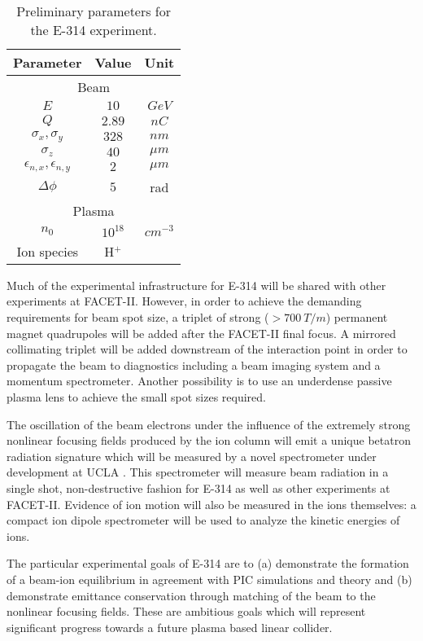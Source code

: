 \documentclass{aac}
\begin{document}
\begin{table}[h]
\begin{tabular}{|c|c|c|}
\hline
Parameter & Value & Unit \\
\hline
\multicolumn{3}{|c|}{Beam} \\
\hline
$E$ & $10$ & $\si{GeV}$  \\
$Q$ & $2.89$  & $\si{nC}$ \\
$\sigma_x,\sigma_y$ & $328$ & $\si{nm}$ \\
$\sigma_z$ & $40$ & $\si{\mu m}$ \\
$\epsilon_{n,x},\epsilon_{n,y}$ & $2$ & $\si{\mu m }$ \\
$\Delta \phi$ & $5$ & rad \\
\hline
\multicolumn{3}{|c|}{Plasma} \\
\hline
$n_0$ & $10^{18}$ & $\si{cm^{-3}}$ \\
Ion species & H$^{+}$ & \\
\hline
\end{tabular}
\caption{Preliminary parameters for the E-314 experiment.}
\label{tab:parameters}
\end{table}

Much of the experimental infrastructure for E-314 will be shared with other experiments at FACET-II. However, in order to achieve the demanding requirements for beam spot size, a triplet of strong ($>\SI{700}{T/m}$) permanent magnet quadrupoles \cite{magnet} will be added after the FACET-II final focus. A mirrored collimating triplet will be added downstream of the interaction point in order to propagate the beam to diagnostics including a beam imaging system and a momentum spectrometer. Another possibility is to use an underdense passive plasma lens \cite{lens} to achieve the small spot sizes required.

The oscillation of the beam electrons under the influence of the extremely strong nonlinear focusing fields produced by the ion column will emit a unique betatron radiation signature which will be measured by a novel spectrometer under development at UCLA \cite{monika}. This spectrometer will measure beam radiation in a single shot, non-destructive fashion for E-314 as well as other experiments at FACET-II. Evidence of ion motion will also be measured in the ions themselves: a compact ion dipole spectrometer will be used to analyze the kinetic energies of ions.

The particular experimental goals of E-314 are to (a) demonstrate the formation of a beam-ion equilibrium in agreement with PIC simulations and theory and (b) demonstrate emittance conservation through matching of the beam to the nonlinear focusing fields. These are ambitious goals which will represent significant progress towards a future plasma based linear collider.
\end{document}
